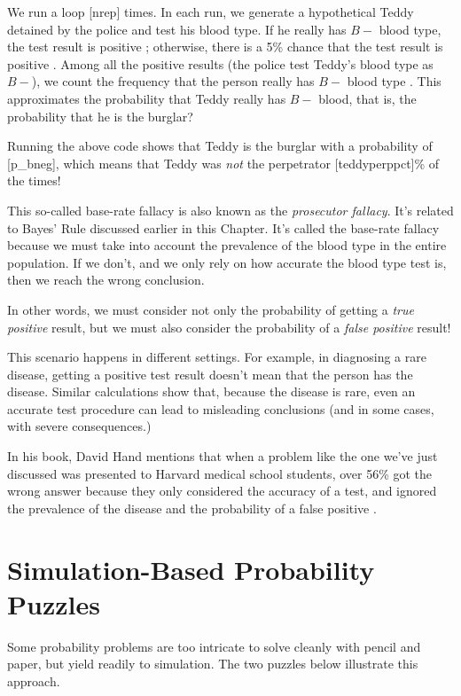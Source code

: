 
We run a loop [nrep] times. In each run, we generate a
hypothetical Teddy detained by the police  and test his blood
type. If he really has $B-$ blood type, the test result is positive
; otherwise, there is a 5\% chance that the test result is positive
. Among all the positive results (the police test Teddy's blood type
as $B-$), we count the frequency that the person really has $B-$ blood type
. This approximates the probability that Teddy really has $B-$
blood, that is, the probability that he is the burglar?


Running the above code shows that Teddy is the burglar with a probability of 
[p_bneg], which means that Teddy was \emph{not}
the perpetrator [teddyperppct]\% of the times!

This so-called base-rate fallacy is also known as the \emph{prosecutor fallacy}.
It's related to Bayes' Rule discussed earlier in this Chapter.  It's called the
base-rate fallacy because we must take into account the prevalence of the blood
type in the entire population. If we don't, and we only rely on how accurate the
blood type test is, then we reach the wrong conclusion.

In other words, we must consider not only the probability of getting a
\emph{true positive} result, but we must also consider the probability of a
\emph{false positive} result!

This scenario happens in different settings. For example, in diagnosing a rare
disease, getting a positive test result doesn't mean that the person has the
disease. Similar calculations show that, because the disease is rare, even an
accurate test procedure can lead to misleading conclusions (and in some cases,
with severe consequences.)

In his book, David Hand mentions that when a problem like the one we've just
discussed was presented to Harvard medical school students, over 56\% got the
wrong answer because they only considered the accuracy of a test, and ignored
the prevalence of the disease and the probability of a false positive
\citep{darkdata_ch2}.

\section{Simulation-Based Probability Puzzles}\label{sec:further}
Some probability problems are too intricate to solve cleanly with pencil and
paper, but yield readily to simulation. The two puzzles below illustrate
this approach.

